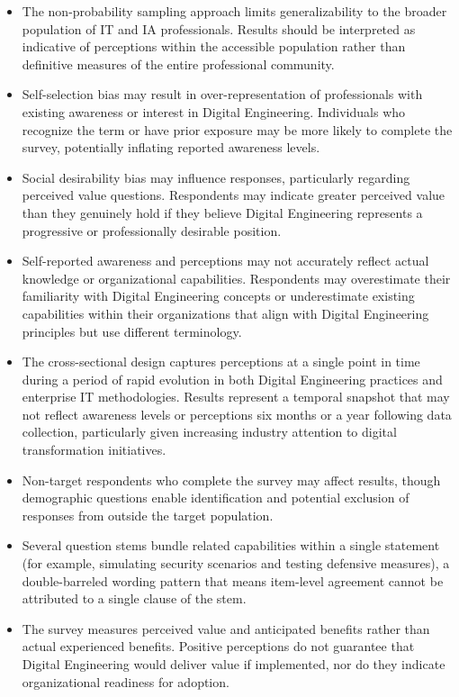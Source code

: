 \begin{itemize}
  \item The non-probability sampling approach limits generalizability to the broader population of IT and IA professionals. Results should be interpreted as indicative of perceptions within the accessible population rather than definitive measures of the entire professional community.

  \item Self-selection bias may result in over-representation of professionals with existing awareness or interest in Digital Engineering. Individuals who recognize the term or have prior exposure may be more likely to complete the survey, potentially inflating reported awareness levels.

  \item Social desirability bias may influence responses, particularly regarding perceived value questions. Respondents may indicate greater perceived value than they genuinely hold if they believe Digital Engineering represents a progressive or professionally desirable position.

  \item Self-reported awareness and perceptions may not accurately reflect actual knowledge or organizational capabilities. Respondents may overestimate their familiarity with Digital Engineering concepts or underestimate existing capabilities within their organizations that align with Digital Engineering principles but use different terminology.

  \item The cross-sectional design captures perceptions at a single point in time during a period of rapid evolution in both Digital Engineering practices and enterprise IT methodologies. Results represent a temporal snapshot that may not reflect awareness levels or perceptions six months or a year following data collection, particularly given increasing industry attention to digital transformation initiatives.

  \item Non-target respondents who complete the survey may affect results, though demographic questions enable identification and potential exclusion of responses from outside the target population.

  \item Several question stems bundle related capabilities within a single statement (for example, simulating security scenarios and testing defensive measures), a double-barreled wording pattern that means item-level agreement cannot be attributed to a single clause of the stem.

  \item The survey measures perceived value and anticipated benefits rather than actual experienced benefits. Positive perceptions do not guarantee that Digital Engineering would deliver value if implemented, nor do they indicate organizational readiness for adoption.
\end{itemize}

